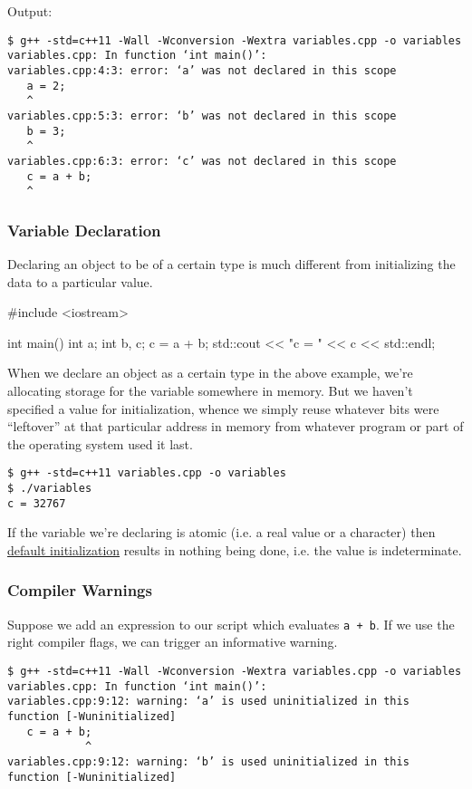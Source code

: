 \documentclass[12pt,letterpaper,twoside]{article}
\begin{document}
Output:

{\footnotesize
\begin{verbatim}
$ g++ -std=c++11 -Wall -Wconversion -Wextra variables.cpp -o variables
variables.cpp: In function ‘int main()’:
variables.cpp:4:3: error: ‘a’ was not declared in this scope
   a = 2;
   ^
variables.cpp:5:3: error: ‘b’ was not declared in this scope
   b = 3;
   ^
variables.cpp:6:3: error: ‘c’ was not declared in this scope
   c = a + b;
   ^
\end{verbatim}
}

\subsubsection{Variable Declaration}
Declaring an object to be of a certain type is much different from initializing the data to a
particular value.

\begin{cpp}
#include <iostream>

int main() {
  int a;
  int b, c;
  c = a + b;
  std::cout << "c = " << c << std::endl;
}
\end{cpp}

When we declare an object as a certain type in the above example,
we're allocating storage for the variable somewhere in memory. But we
haven't specified a value for initialization, whence we simply reuse
whatever bits were ``leftover'' at that particular address in memory
from whatever program or part of the operating system used it last.
{
\footnotesize
\begin{verbatim}
$ g++ -std=c++11 variables.cpp -o variables
$ ./variables
c = 32767
\end{verbatim}
}
If the variable we're declaring is
atomic (i.e. a real value or a character) then
\href{https://en.cppreference.com/w/cpp/language/default_initialization}{default initialization}
results in nothing being done,
i.e. the value is indeterminate.

\subsubsection{Compiler Warnings}
Suppose we add an expression to our script which evaluates \texttt{a +
  b}. If we use the right compiler flags, we can trigger an
informative warning.
{\footnotesize
\begin{verbatim}
$ g++ -std=c++11 -Wall -Wconversion -Wextra variables.cpp -o variables
variables.cpp: In function ‘int main()’:
variables.cpp:9:12: warning: ‘a’ is used uninitialized in this function [-Wuninitialized]
   c = a + b;
            ^
variables.cpp:9:12: warning: ‘b’ is used uninitialized in this function [-Wuninitialized]
\end{verbatim}
}
\end{document}
